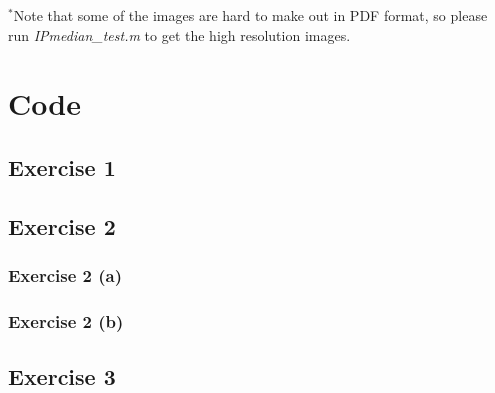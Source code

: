 \documentclass{article}
\begin{document}
$^*$Note that some of the images are hard to make out in PDF format, so please run \textit{IPmedian\_test.m} to get the high resolution images.

\newpage

\typeout{}


\appendix
\section{Code}
\subsection{Exercise 1}

\subsection{Exercise 2}
\subsubsection{Exercise 2 (a)}


\subsubsection{Exercise 2 (b)}

\subsection{Exercise 3}

\end{document}
